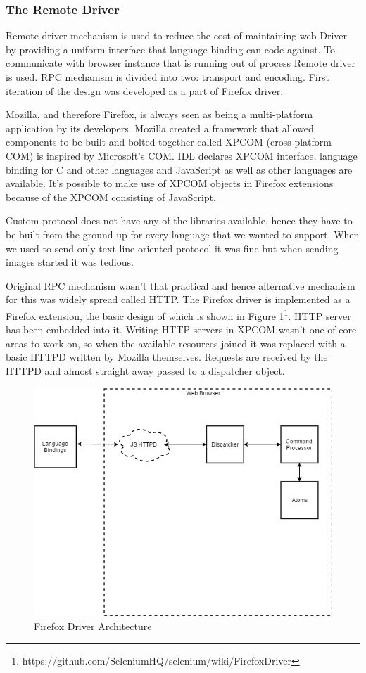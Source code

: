 \documentclass[article,type=msc,colorback,accentcolor=tud9c,twoside,11pt]{tudthesis}
\begin{document}
\subsubsection{The Remote Driver}

Remote driver mechanism is used to reduce the cost of maintaining web Driver by providing a uniform interface that language binding can code against. To communicate with browser instance that is running out of process Remote driver is used. RPC mechanism is divided into two: transport and encoding. First iteration of the design was developed as a part of Firefox driver.

Mozilla, and therefore Firefox, is always seen as being a multi-platform application by its developers. Mozilla created a framework that allowed components to be built and bolted together called XPCOM (cross-platform COM) is inspired by Microsoft's COM.  IDL declares XPCOM interface, language binding for C and other languages and JavaScript as well as other languages are available. It's possible to make use of XPCOM objects in Firefox extensions because of the XPCOM consisting of JavaScript.

Custom protocol does not have any of the libraries available, hence they have to be built from the ground up for every language that we wanted to support. When we used to send only text line oriented protocol it was fine but when sending images started it was tedious.

Original RPC mechanism wasn't that practical and hence  alternative mechanism for this was widely spread called HTTP. The Firefox driver is implemented as a Firefox extension, the basic design of which is shown in Figure \ref{fig:Flowchart}\footnote{https://github.com/SeleniumHQ/selenium/wiki/FirefoxDriver}. HTTP server has been embedded into it. Writing HTTP servers in XPCOM wasn't one of core areas to work on, so when the available resources joined it was replaced with a basic HTTPD written by Mozilla themselves. Requests are received by the HTTPD and almost straight away passed to a dispatcher object.

\begin{figure}[h]
	\centering
	\includegraphics[scale=0.6]{SeleniumHttp.PNG}
	\caption{Firefox Driver Architecture}
	\label{fig:Flowchart}
\end{figure}
\end{document}
